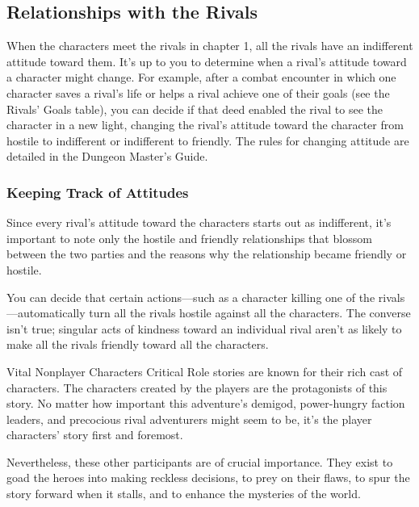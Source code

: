 \documentclass[10pt,a4paper,twoside,bg=print,twocolumn,openany,nodeprecatedcode]{dndbook}
\begin{document}
\subsection{Relationships with the Rivals}
When the characters meet the rivals in chapter 1, all the rivals have an indifferent attitude toward them. It's up to you to determine when a rival's attitude toward a character might change. For example, after a combat encounter in which one character saves a rival's life or helps a rival achieve one of their goals (see the Rivals' Goals table), you can decide if that deed enabled the rival to see the character in a new light, changing the rival's attitude toward the character from hostile to indifferent or indifferent to friendly. The rules for changing attitude are detailed in the Dungeon Master's Guide.

\subsubsection{Keeping Track of Attitudes}
Since every rival's attitude toward the characters starts out as indifferent, it's important to note only the hostile and friendly relationships that blossom between the two parties and the reasons why the relationship became friendly or hostile.

You can decide that certain actions—such as a character killing one of the rivals—automatically turn all the rivals hostile against all the characters. The converse isn't true; singular acts of kindness toward an individual rival aren't as likely to make all the rivals friendly toward all the characters.

\begin{DndSidebar}[float=!b]{Vital Nonplayer Characters}
Critical Role stories are known for their rich cast of characters. The characters created by the players are the protagonists of this story. No matter how important this adventure's demigod, power-hungry faction leaders, and precocious rival adventurers might seem to be, it's the player characters' story first and foremost.



Nevertheless, these other participants are of crucial importance. They exist to goad the heroes into making reckless decisions, to prey on their flaws, to spur the story forward when it stalls, and to enhance the mysteries of the world.



\end{DndSidebar}
\end{document}
